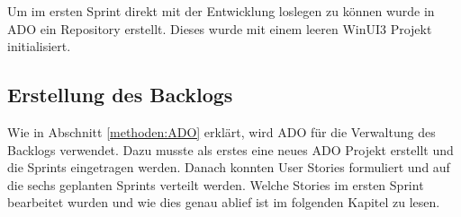 Um im ersten Sprint direkt mit der Entwicklung loslegen zu können wurde in \ac{ADO} ein Repository erstellt.
Dieses wurde mit einem leeren WinUI3 Projekt initialisiert.


\subsection{Erstellung des Backlogs}
Wie in Abschnitt \ref{methoden:ADO} erklärt, wird \ac{ADO} für die Verwaltung des Backlogs verwendet.
Dazu musste als erstes eine neues \ac{ADO} Projekt erstellt und die Sprints eingetragen werden.
Danach konnten User Stories formuliert und auf die sechs geplanten Sprints verteilt werden.
Welche Stories im ersten Sprint bearbeitet wurden und wie dies genau ablief ist im folgenden Kapitel zu lesen.
